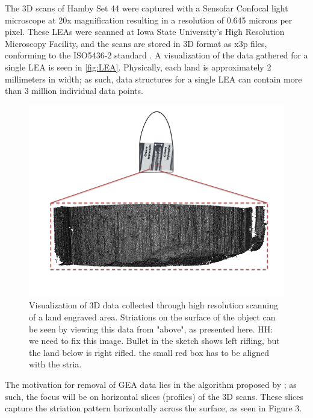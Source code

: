 \documentclass[]{article}
\begin{document}
The 3D scans of Hamby Set 44 were captured with a Sensofar Confocal
light microscope at 20x magnification resulting in a resolution of 0.645
microns per pixel. These LEAs were scanned at Iowa State University's
High Resolution Microscopy Facility, and the scans are stored in 3D
format as x3p files, conforming to the ISO5436-2 standard
\citep{ISO5436}. A visualization of the data gathered for a single LEA
is seen in \autoref{fig:LEA}. Physically, each land is approximately 2
millimeters in width; as such, data structures for a single LEA can
contain more than 3 million individual data points.

\begin{figure}
\includegraphics[width=\textwidth]{./images/3d_plot_top_context_breakoff} \caption{Visualization of 3D data collected through high resolution scanning of a land engraved area. Striations on the surface of the object can be seen by viewing this data from "above", as presented here. HH: we need to fix this image. Bullet in the sketch shows left rifling, but the land below is right rifled. the small red box has to be aligned with the stria. }\label{fig:LEA}
\end{figure}

The motivation for removal of GEA data lies in the algorithm proposed by
\citet{Hare1}; as such, the focus will be on horizontal slices
(profiles) of the 3D scans. These slices capture the striation pattern
horizontally across the surface, as seen in Figure 3.
\end{document}
